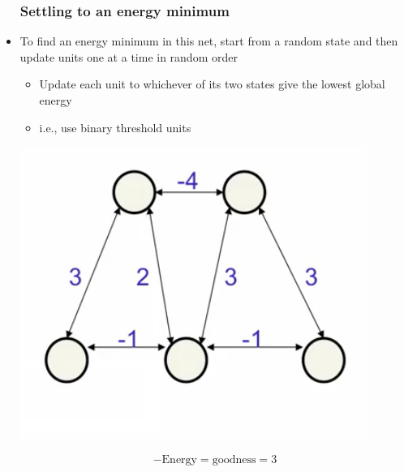 \begin{itemize}
	\subsubsection{Settling to an energy minimum}
	\item To find an energy minimum in this net, start from a random state and then update units one at a time in random order
	\begin{itemize}
		\item Update each unit to whichever of its two states give the lowest global energy
		\item i.e., use binary threshold units
	\end{itemize}
	\begin{center}
		\includegraphics[scale=0.8]{sections/11/min.png}
	\end{center}
	$$-\text{Energy}=\text{goodness}=3$$


\end{itemize}
